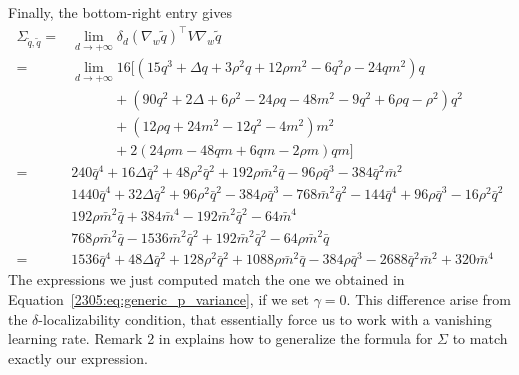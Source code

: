 Finally, the bottom-right entry gives
\[\begin{split}
 \Sigma_{\tilde q, \tilde q} =&  \lim_{d\to+\infty} \delta_d (\nabla_w{\tilde q})^\top V \nabla_w{\tilde q}  \\ 
 =& \lim_{d\to+\infty}16\Big[(15q^3+\Delta q+3\rho^2q+12\rho m^2-6q^2\rho-24qm^2)q \\
 &\qquad\quad + (90q^2+2\Delta+6\rho^2-24\rho q -48m^2-9q^2+6\rho q-\rho^2)q^2 \\
 &\qquad\quad +(12\rho q + 24m^2-12q^2-4m^2)m^2 \\
 &\qquad\quad +2(24\rho m-48qm+6qm-2\rho m)qm \Big] \\
 =& 240 \bar q^4+16\Delta \bar q^2+48\rho^2\bar q^2+192\rho \bar m^2 \bar q-96\rho \bar q^3-384\bar q^2 \bar m^2 \\
  & 1440 \bar q^4 + 32\Delta \bar q^2 + 96\rho^2\bar q^2 - 384\rho \bar q^3 -768 \bar m ^2 \bar q^2 - 144 \bar q^4 +96\rho \bar q^3 - 16\rho^2 \bar q^2 \\
  & 192 \rho \bar m^2 \bar q + 384 \bar m^4 - 192 \bar m^2 \bar q^2 - 64 \bar m^4 \\
  & 768 \rho \bar m^2 \bar q - 1536 \bar m^2 \bar q^2 + 192 \bar m^2 \bar q^2 - 64 \rho \bar m^2 \bar q \\
 =& 1536 \bar q^4+48\Delta \bar q^2 + 128\rho^2\bar q^2+1088\rho \bar m^2 \bar q-384\rho \bar q^3-2688\bar q^2 \bar m^2 +320 \bar m^4
\end{split}\]
The expressions we just computed match the one we obtained in Equation~\eqref{2305:eq:generic_p_variance}, if we set \(\gamma=0\). This difference arise from the \(\delta\)-localizability condition, that essentially force us to work with a vanishing learning rate. Remark 2 in \cite{arous2022high} explains how to generalize the formula for \(\Sigma\) to match exactly our expression.


